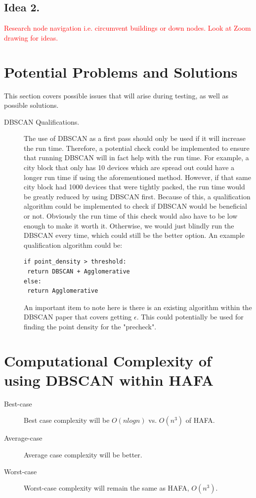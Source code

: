 \documentclass[letterpaper,twocolumn,10pt]{article}
\newcommand\todo[1]{\textcolor{red}{#1}}
\begin{document}
\subsection{Idea 2.} \todo{Research node navigation i.e. circumvent buildings or down nodes. Look at Zoom drawing for ideas.}

\section{Potential Problems and Solutions}
This section covers possible issues that will arise during testing, as well as possible solutions.
\begin{description}
\item[DBSCAN Qualifications.] The use of DBSCAN as a first pass should only be used if it will increase the run time. Therefore, a potential check could be implemented to ensure that running DBSCAN will in fact help with the run time. For example, a city block that only has 10 devices which are spread out could have a longer run time if using the aforementioned method. However, if that same city block had 1000 devices that were tightly packed, the run time would be greatly reduced by using DBSCAN first. Because of this, a qualification algorithm could be implemented to check if DBSCAN would be beneficial or not. Obviously the run time of this check would also have to be low enough to make it worth it. Otherwise, we would just blindly run the DBSCAN every time, which could still be the better option. An example qualification algorithm could be:
\begin{verbatim}
if point_density > threshold:
 return DBSCAN + Agglomerative
else:
 return Agglomerative
\end{verbatim}
An important item to note here is there is an existing algorithm within the DBSCAN paper that covers getting $\epsilon$. This could potentially be used for finding the point density for the "precheck".
\end{description}

\section{Computational Complexity of using DBSCAN within HAFA}

\begin{description}
\item[Best-case] Best case complexity will be $O (n log n)$ vs. $O(n^3)$ of HAFA.
\item[Average-case] Average case complexity will be better.
\item[Worst-case] Worst-case complexity will remain the same as HAFA, $O(n^3)$.
\end{description}
\end{document}
